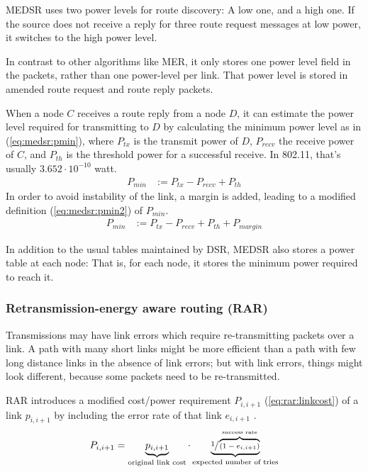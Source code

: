 MEDSR uses two power levels for route discovery: A low one, and a high one. If
the source does not receive a reply for three route request messages at low
power, it switches to the high power level.

In contrast to other algorithms like MER, it only stores one power level field
in the packets, rather than one power-level per link. That power level is stored
in amended route request and route reply packets.

When a node $C$ receives a route reply from a node $D$, it can estimate the
power level required for transmitting to $D$ by calculating the minimum power
level as in (\ref{eq:medsr:pmin}), where $P_{tx}$ is the transmit power of $D$, $P_{recv}$ the receive power of $C$,
and $P_{th}$ is the threshold power for a successful receive. In 802.11, that's
usually $3.652 \cdot 10^{-10}$ watt.
\begin{align}
  \label{eq:medsr:pmin}
   P_{min} &:= P_{tx} - P_{recv} + P_{th} 
\end{align}
In order to avoid instability of the link, a margin is added,
leading to a modified definition (\ref{eq:medsr:pmin2}) of $P_{min}$.
\begin{align}
  \label{eq:medsr:pmin2}
   P_{min} &:= P_{tx} - P_{recv} + P_{th} + P_{margin}
\end{align}

In addition to the usual tables maintained by DSR, MEDSR also stores a power
table at each node: That is, for each node, it stores the minimum power required to reach it.



\subsubsection{Retransmission-energy aware routing (RAR)}
Transmissions may have link errors which require re-transmitting packets over
a link. A path with many short links might be more efficient than a path with
few long distance links in the absence of link errors; but with link errors,
things might look different, because some packets need to be re-transmitted.

RAR\cite{banerjee2002minimum} introduces a modified cost/power requirement
$P_{i,i+1}$ (\ref{eq:rar:linkcost}) of a link $p_{i,i+1}$ by including the error
rate of that link $e_{i,i+1}$ .
\begin{align}\label{eq:rar:linkcost}
  P_{i,i+1} = \underbrace{p_{i,i+1}}_{\text{original link cost}} \cdot \underbrace{\sfrac{1}{\overbrace{(1-e_{i,i+1})}^{\text{success rate}}}}_{\text{expected number of tries}}
\end{align} 

